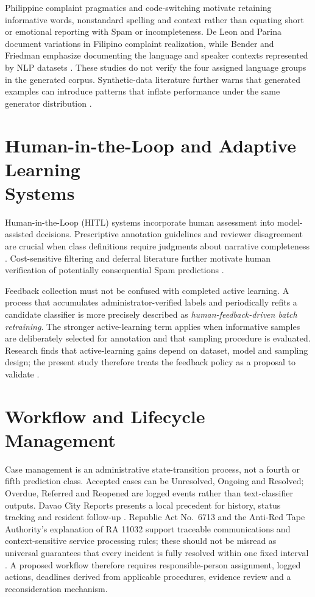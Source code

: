 Philippine complaint pragmatics and code-switching motivate retaining informative words, nonstandard spelling and context rather than equating short or emotional reporting with Spam or incompleteness. De Leon and Parina document variations in Filipino complaint realization, while Bender and Friedman emphasize documenting the language and speaker contexts represented by NLP datasets \cite{deleon,benderfriedman}. These studies do not verify the four assigned language groups in the generated corpus. Synthetic-data literature further warns that generated examples can introduce patterns that inflate performance under the same generator distribution \cite{li2023,shaib}.

\section[Human-in-the-Loop and Adaptive Learning Systems]{Human-in-the-Loop and Adaptive Learning\protect\\ Systems}
Human-in-the-Loop (HITL) systems incorporate human assessment into model-assisted decisions. Prescriptive annotation guidelines and reviewer disagreement are crucial when class definitions require judgments about narrative completeness \cite{rottger2022,fleisig2024}. Cost-sensitive filtering and deferral literature further motivate human verification of potentially consequential Spam predictions \cite{madras2018,franc2023}.

Feedback collection must not be confused with completed active learning. A process that accumulates administrator-verified labels and periodically refits a candidate classifier is more precisely described as \emph{human-feedback-driven batch retraining}. The stronger active-learning term applies when informative samples are deliberately selected for annotation and that sampling procedure is evaluated. Research finds that active-learning gains depend on dataset, model and sampling design; the present study therefore treats the feedback policy as a proposal to validate \cite{ghose2024,beatty2018}.

\section{Workflow and Lifecycle Management}
Case management is an administrative state-transition process, not a fourth or fifth prediction class. Accepted cases can be Unresolved, Ongoing and Resolved; Overdue, Referred and Reopened are logged events rather than text-classifier outputs. Davao City Reports presents a local precedent for history, status tracking and resident follow-up \cite{dcr}. Republic Act No.~6713 and the Anti-Red Tape Authority's explanation of RA 11032 support traceable communications and context-sensitive service processing rules; these should not be misread as universal guarantees that every incident is fully resolved within one fixed interval \cite{ra6713,ra11032}. A proposed workflow therefore requires responsible-person assignment, logged actions, deadlines derived from applicable procedures, evidence review and a reconsideration mechanism.

